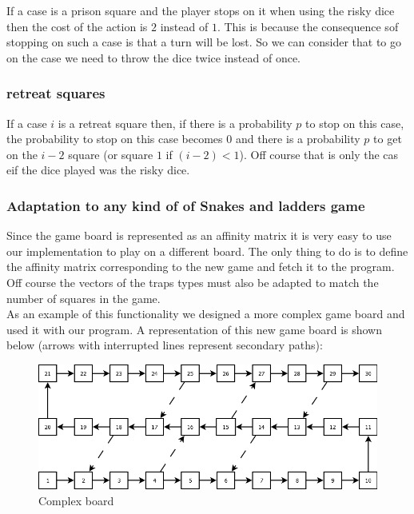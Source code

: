 \documentclass{eplDoc}
\begin{document}
If a case is a prison square and the player stops on it when using the risky dice then the cost of the action is $2$ instead of $1$. This is because the consequence sof stopping on such a case is that a turn will be lost. So we can consider that to go on the case we need to throw the dice twice instead of once. 

\subsubsection{retreat squares}

If a case $i$ is a retreat square then, if there is a probability $p$ to stop on this case,  the probability to stop on this case becomes $0$ and there is a probability $p$ to get on the  $i-2$ square (or square $1$ if $(i-2)<1$). Off course that is only the cas eif the dice played was the risky dice. 


\subsubsection{Adaptation to any kind of of Snakes and ladders game}

Since the game board is represented as an affinity matrix it is very easy to use our implementation to play on a different board. The only thing to do is to define the affinity matrix corresponding to the new game and fetch it to the program. Off course the vectors of the traps types must also be adapted to match the number of squares in the game. \\ 
As an example of this functionality we designed a more complex game board and used it with our program. A representation of this new game board is shown below (arrows with interrupted lines represent secondary paths): 

\FloatBarrier
\begin{figure}%
	\includegraphics[width=\columnwidth]{newboard.png}%
	\caption{Complex board}%
	\label{newboard}%
\end{figure}
\FloatBarrier
 \ \\ 
\end{document}
